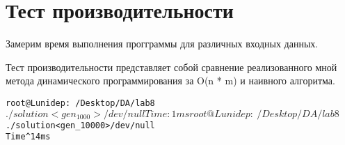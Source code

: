 \section{Тест производительности}

Замерим время выполнения прогграммы для различных входных данных. \newline

Тест производительности представляет собой сравнение реализованного мной метода
динамического программирования за O(n * m) и наивного алгоритма.\newline

\begin{alltt}
root@Lunidep:~/Desktop/DA/lab8$ ./solution <gen_1000 >/dev/null
Time: 1 ms
root@Lunidep:~/Desktop/DA/lab8$ ./solution <gen_10000 >/dev/null
Time^ 14 ms
\end{alltt}

\pagebreak
